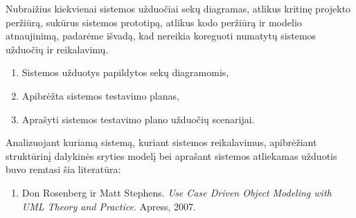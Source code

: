 \documentclass{VUMIFPSkursinis}
\begin{document}
			Nubraižius kiekvienai sistemos užduočiai sekų diagramas, atlikus kritinę projekto peržiūrą, sukūrus sistemos prototipą, atlikus kodo peržiūrą ir modelio atnaujinimą, padarėme išvadą, kad nereikia koreguoti numatytų sistemos užduočių ir reikalavimų.
			
			\begin{enumerate}
				\item Sistemos užduotys papildytos sekų diagramomis,
				\item Apibrėžta sistemos testavimo planas,
				\item Aprašyti sistemos testavimo plano užduočių scenarijai.
			\end{enumerate}
        Analizuojant kuriamą sistemą, kuriant sistemos reikalavimus, apibrėžiant struktūrinį dalykinės sryties modelį bei aprašant sistemos atliekamas užduotis buvo remtasi šia literatūra:
            \begin{enumerate}
                \item Don Rosenberg ir Matt Stephens. \textit{Use Case Driven Object Modeling with UML Theory and Practice}. Apress, 2007.
            \end{enumerate}
      
    
\end{document}

